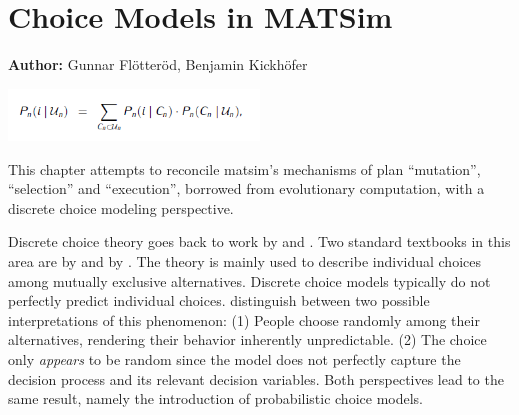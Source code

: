 \chapter{Choice Models in MATSim}
\label{ch:discretechoice}

\hfill \textbf{Author:} Gunnar Flötteröd, Benjamin Kickhöfer


\begin{center} \includegraphics[width=0.5\textwidth, angle=0]{understanding/figures/dc.png} \end{center}

This chapter attempts to reconcile \gls{matsim}'s mechanisms of plan
{}``mutation'', {}``selection'' and {}``execution'', borrowed from evolutionary computation, with a 
discrete choice modeling perspective. 

Discrete choice theory goes back to work by \citet{Luce1965PreferenceUtility} and 
\citet{McFadden1975DiscreteChoiceModel}. Two standard textbooks in this area are by
\citet{BenAkivaLerman_1985} and by \citet{Train_2003}. The theory is mainly used 
to describe individual choices among 
mutually exclusive %
alternatives. 
Discrete choice models typically do not perfectly predict individual choices.
\citet{Luce1965PreferenceUtility} distinguish between two possible interpretations of this phenomenon:
(1) People choose randomly among their alternatives, rendering their behavior inherently unpredictable.
(2) The choice only \emph{appears} to be random since the model does not
perfectly capture the decision process and its relevant decision variables.
Both perspectives lead to the same result, namely the %
introduction of probabilistic choice models.

